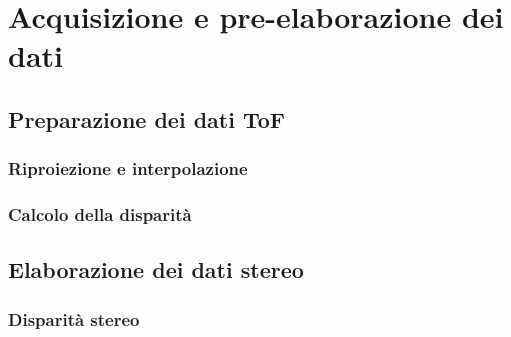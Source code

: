 \chapter{Acquisizione e pre-elaborazione dei dati}

\section{Preparazione dei dati ToF}

\subsection{Riproiezione e interpolazione}

\subsection{Calcolo della disparità}

\section{Elaborazione dei dati stereo}

\subsection{Disparità stereo}
